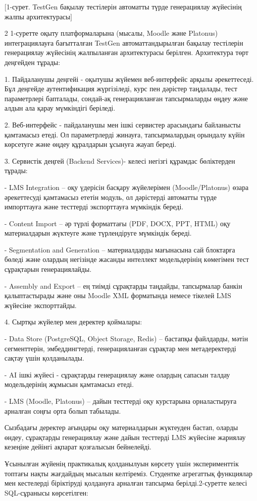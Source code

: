 [1-сурет. TestGen бақылау тестілерін автоматты түрде генерациялау
жүйесінің жалпы архитектурасы]

\begin{multicols}{2}
1-суретте оқыту платформаларына (мысалы, Moodle және Platonus)
интеграциялауға бағытталған TestGen автоматтандырылған бақылау
тестілерін генерациялау жүйесінің жалпыланған архитектурасы берілген.
Архитектура төрт деңгейден тұрады:

1. Пайдаланушы деңгейі - оқытушы жүйемен веб-интерфейс арқылы
әрекеттеседі. Бұл деңгейде аутентификация жүргізіледі, курс пен
дәрістер таңдалады, тест параметрлері бапталады, сондай-ақ
генерацияланған тапсырмаларды өңдеу және алдын ала қарау мүмкіндігі
беріледі.

2. Веб-интерфейс - пайдаланушы мен ішкі сервистер арасындағы байланысты
қамтамасыз етеді. Ол параметрлерді жинауға, тапсырмалардың орындалу
күйін көрсетуге және өңдеу құралдарын ұсынуға жауап береді.

3. Сервистік деңгей (Backend Services)- келесі негізгі құрамдас
бөліктерден тұрады:

- LMS Integration -- оқу үдерісін басқару жүйелерімен
(Moodle/Platonus) өзара әрекеттесуді қамтамасыз ететін модуль, ол
дәрістерді автоматты түрде импорттауға және тесттерді экспорттауға
мүмкіндік береді.

- Content Import -- әр түрлі форматтағы (PDF, DOCX, PPT, HTML) оқу
материалдарын жүктеуге және түрлендіруге мүмкіндік береді.

- Segmentation and Generation -- материалдарды мағынасына сай
блоктарға бөледі және олардың негізінде жасанды интеллект
модельдерінің көмегімен тест сұрақтарын генерациялайды.

- Assembly and Export -- ең тиімді сұрақтарды таңдайды, тапсырмалар
банкін қалыптастырады және оны Moodle XML форматында немесе тікелей
LMS жүйесіне экспорттайды.

4. Сыртқы жүйелер мен деректер қоймалары:

- Data Store (PostgreSQL, Object Storage, Redis) -- бастапқы
файлдарды, мәтін сегменттерін, эмбеддингтерді, генерацияланған
сұрақтар мен метадеректерді сақтау үшін қолданылады.

- AI ішкі жүйесі - сұрақтарды генерациялау және олардың сапасын талдау
модельдерінің жұмысын қамтамасыз етеді.

- LMS (Moodle, Platonus) -- дайын тесттерді оқу курстарына орналастыруға
арналған соңғы орта болып табылады.

Сызбадағы деректер ағындары оқу материалдарын жүктеуден бастап, оларды
өндеу, сұрақтарды генерациялау және дайын тесттерді LMS жүйесіне
жариялау кезеңіне дейінгі ақпарат қозғалысын бейнелейді.

Ұсынылған жүйенің практикалық қолданылуын көрсету үшін эксперименттік
топтағы нақты жағдайдың мысалын келтіреміз. Студентке агрегаттық
функциялар мен кестелерді біріктіруді қолдануға арналған тапсырма
берілді.2-суретте келесі SQL-сұранысы көрсетілген:
\end{multicols}

